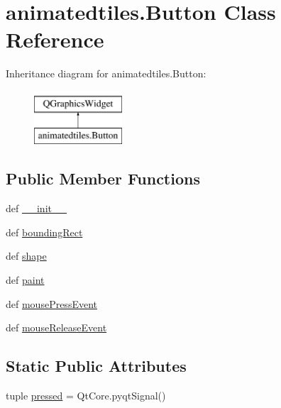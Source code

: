\hypertarget{classanimatedtiles_1_1Button}{}\section{animatedtiles.\+Button Class Reference}
\label{classanimatedtiles_1_1Button}
Inheritance diagram for animatedtiles.\+Button\+:\begin{figure}[H]
\begin{center}
\leavevmode
\includegraphics[height=2.000000cm]{classanimatedtiles_1_1Button}
\end{center}
\end{figure}
\subsection*{Public Member Functions}
\begin{DoxyCompactItemize}
\item 
def \hyperlink{classanimatedtiles_1_1Button_a0cf30f6e5604047e86bcd61f66a251f1}{\+\_\+\+\_\+init\+\_\+\+\_\+}
\item 
def \hyperlink{classanimatedtiles_1_1Button_aff6255102fd16b6452cf37c1e60dcd65}{bounding\+Rect}
\item 
def \hyperlink{classanimatedtiles_1_1Button_af60d3beceee946b5e2cce3a0f680b0c4}{shape}
\item 
def \hyperlink{classanimatedtiles_1_1Button_afea8628d108a3bd22cff955b5ff4fc6d}{paint}
\item 
def \hyperlink{classanimatedtiles_1_1Button_a907bef85387ed5aac4ebe282039f94b6}{mouse\+Press\+Event}
\item 
def \hyperlink{classanimatedtiles_1_1Button_a7e80fa2349c9d56ac1d0d33dfd00fbee}{mouse\+Release\+Event}
\end{DoxyCompactItemize}
\subsection*{Static Public Attributes}
\begin{DoxyCompactItemize}
\item 
tuple \hyperlink{classanimatedtiles_1_1Button_a719a8b6ff662f39780c9307d2af2201a}{pressed} = Qt\+Core.\+pyqt\+Signal()
\end{DoxyCompactItemize}


